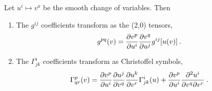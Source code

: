 \begin{proposition} \label{prop:transoformace}
    Let $u^i \mapsto v^a$ be the smooth change of variables. Then
    \begin{enumerate}
        \item The $g^{ij}$ coefficients transform as the (2,0) tensors,
        \begin{align}
            g^{pq}(v) = \frac{\partial v^p}{\partial u^i} \frac{\partial v^q}{\partial u^j} g^{ij}[u(v)] \:. \label{eq:transformace-metrika}
        \end{align}
        \item The $\Gamma^i_{jk}$ coefficients  transform as Christoffel symbols,
        \begin{align}
            \Gamma^p_{qr} (v) = \frac{\partial v^p}{\partial u^i} \frac{\partial u^j}{\partial v^q} \frac{\partial u^k}{\partial v^r} \Gamma^i_{jk}(u) + \frac{\partial v^p}{\partial u^i} \frac{\partial^2 u^i}{\partial v^q \partial v^r} \:. \label{eq:transformace-konexe}
        \end{align}
    \end{enumerate}
\end{proposition}


